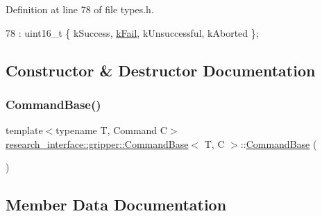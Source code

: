 Definition at line 78 of file types.\+h.


\begin{DoxyCode}
78 : uint16\_t \{ kSuccess, \hyperlink{namespacetesting_1_1internal_adfcd859062983a889f4bd18e6977357ea6fc25174a501f31b090a2b556f77fdc1}{kFail}, kUnsuccessful, kAborted \};
\end{DoxyCode}


\subsection{Constructor \& Destructor Documentation}
\mbox{\label{structresearch__interface_1_1gripper_1_1CommandBase_a0cce4e8ceb4d82276c45dcdfc2da18b4}} 
\subsubsection{\texorpdfstring{Command\+Base()}{CommandBase()}}
{\footnotesize\ttfamily template$<$typename T, Command C$>$ \\
\hyperlink{structresearch__interface_1_1gripper_1_1CommandBase}{research\+\_\+interface\+::gripper\+::\+Command\+Base}$<$ T, C $>$\+::\hyperlink{structresearch__interface_1_1gripper_1_1CommandBase}{Command\+Base} (\begin{DoxyParamCaption}{ }\end{DoxyParamCaption})\hspace{0.3cm}{\ttfamily [delete]}}



\subsection{Member Data Documentation}
\mbox{\label{structresearch__interface_1_1gripper_1_1CommandBase_a010ab31c807dd0b5da5c6e5eb97b24c6}} 
